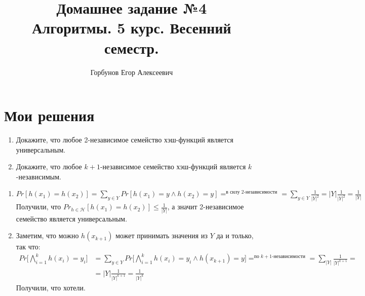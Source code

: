 
\title{Домашнее задание №4 \\ Алгоритмы. 5 курс. Весенний семестр.}
\author{Горбунов Егор Алексеевич}


\maketitle

\section{Мои решения}

\begin{task}[1]
	\begin{enumerate}[label={(\alph*)}]
		\item Докажите, что любое 2-независимое семейство хэш-функций является универсальным.
		\item Докажите, что  любое $k+1$-независимое семейство хэш-функций является $k$-независимым.
	\end{enumerate}
\end{task}
\begin{solution}
	\begin{enumerate}[label={(\alph*)}]
		\item $Pr[h(x_1) = h(x_2)] = \sum_{y \in Y}{Pr[h(x_1) = y \wedge h(x_2) = y]} =^{\text{в силу 2-независимости}} =  \sum_{y \in Y}{\frac{1}{|Y|^2}} = |Y|\frac{1}{|Y|^2} = \frac{1}{|Y|}$
		Получили, что $Pr_{h \in \mathcal{H}}[h(x_1) = h(x_2)] \leqslant \frac{1}{|Y|}$, а значит 2-независимое семейство является универсальным. \xqed
		\item Заметим, что можно $h(x_{k+1})$ может принимать значения из $Y$ да и только, так что:
		\begin{align*}
			Pr\big[\bigwedge_{i=1}^{k}{h(x_i) = y_i}\big] &= \sum_{y \in Y}{Pr\big[\bigwedge_{i=1}^{k}{h(x_i) = y_i} \wedge h(x_{k+1}) = y\big]} =^{\text{по $k+1$-независимости}} = \sum_{|Y|}{\frac{1}{|Y|^{k+1}}} =\\
			&= |Y|\frac{1}{|Y|^{k+1}} = \frac{1}{|Y|^k}
		\end{align*}
		Получили, что хотели. \xqed
	\end{enumerate}
\end{solution}


